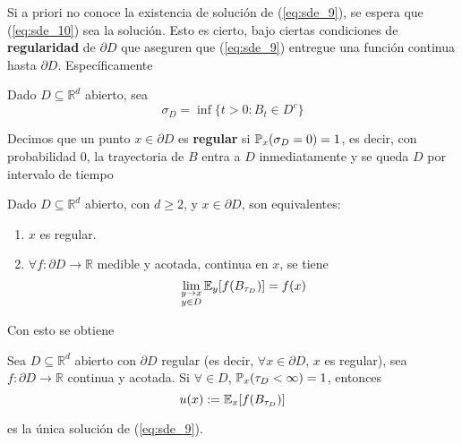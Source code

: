 \newp Si a priori no conoce la existencia de solución de (\ref{eq:sde_9}), se espera que (\ref{eq:sde_10}) 
sea la solución. Esto es cierto, bajo ciertas condiciones de \textbf{regularidad} de $\partial D$ que 
aseguren que (\ref{eq:sde_9}) entregue una función continua hasta $\partial D$. Específicamente 

\begin{definition}
        Dado $D \subseteq \mathbb{R}^{d}$ abierto, sea 
        \begin{equation*}
                \sigma_D = \inf \{ t> 0: B_t \in D^{c}\}
        \end{equation*}

        Decimos que un punto $x \in \partial D$ es \textbf{regular} si $\P_x (\sigma_D = 0) =1$, 
        es decir, con probabilidad $0$, la trayectoria de $B$ entra a $D$ inmediatamente y se queda 
        $D$ por intervalo de tiempo
\end{definition}

\begin{theorem}
        Dado $D \subseteq \mathbb{R}^{d}$ abierto, con $d \ge  2$, y $x \in \partial D$, son equivalentes: 
        \begin{enumerate}
                \item $x$ es regular.
                \item $\forall  f : \partial D \to \mathbb{R}$  medible y acotada, continua en $x$, se tiene 
                        \begin{equation*}
                                \lim_{\substack{y \to  x \\ y \in D}} \E_{y} [f(B_{\tau_D})] = f(x)
                        \end{equation*}
        \end{enumerate}
\end{theorem}

Con esto se obtiene 

\begin{theorem}
        Sea $D \subseteq \mathbb{R}^{d}$ abierto con $\partial D$ regular (es decir, $\forall x \in \partial D$, 
        $x$ es regular), sea $f : \partial D \to  \mathbb{R}$ continua y acotada. Si $\forall  \in D$, 
        $\P_{x} (\tau_D < \infty ) = 1$, entonces 
        \begin{equation*}
                u(x) := \E_{x} [f(B_{\tau_D})]
        \end{equation*}

        es la única solución de (\ref{eq:sde_9}).
\end{theorem}

